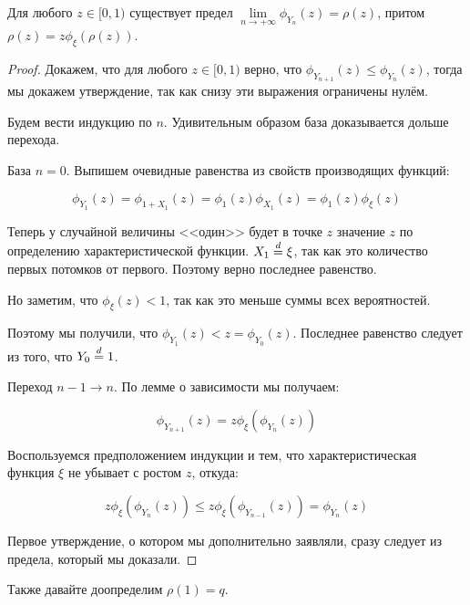 \begin{lemma}
  Для любого $z \in [0, 1)$ существует предел $\lim\limits_{n \to +\infty} 
  \phi_{Y_n}(z) = \rho(z)$, притом $\rho(z) = z\phi_{\xi}(\rho(z))$.
\end{lemma}

\begin{proof}
  Докажем, что для любого $z \in [0, 1)$ верно, что
  $\phi_{Y_{n + 1}}(z) \leqslant \phi_{Y_n}(z)$, тогда мы докажем утверждение,
  так как снизу эти выражения ограничены нулём.

  Будем вести индукцию по $n$. Удивительным образом база доказывается дольше
  перехода. 

  База $n = 0$. Выпишем очевидные равенства из свойств производящих функций:

  \[
    \phi_{Y_1}(z) = \phi_{1 + X_1}(z) = \phi_{1}(z)\phi_{X_1}(z) = 
    \phi_{1}(z)\phi_{\xi}(z)
  \]

  Теперь у случайной величины <<один>> будет в точке $z$ значение $z$ по определению
  характеристической функции. $X_1 \overset{d}{=} \xi$, так как это количество
  первых потомков от первого. Поэтому верно последнее равенство.

  Но заметим, что $\phi_{\xi}(z) < 1$, так как это меньше суммы всех вероятностей.

  Поэтому мы получили, что $\phi_{Y_1}(z) < z = \phi_{Y_0}(z)$. Последнее равенство
  следует из того, что $Y_0 \overset{d}{=} 1$.

  Переход $n - 1 \to n$. По лемме о зависимости мы получаем:

  \[
    \phi_{Y_{n + 1}}(z) = z\phi_{\xi}(\phi_{Y_n}(z))
  \]

  Воспользуемся предположением индукции и тем, что характеристическая функция
  $\xi$ не убывает с ростом $z$, откуда:

  \[
    z\phi_{\xi}(\phi_{Y_n}(z)) \leqslant z\phi_{\xi}(\phi_{Y_{n - 1}}(z)) =
    \phi_{Y_n}(z)
  \]

  Первое утверждение, о котором мы дополнительно заявляли, сразу следует из предела,
  который мы доказали.

\end{proof}

Также давайте доопределим $\rho(1) = q$.
